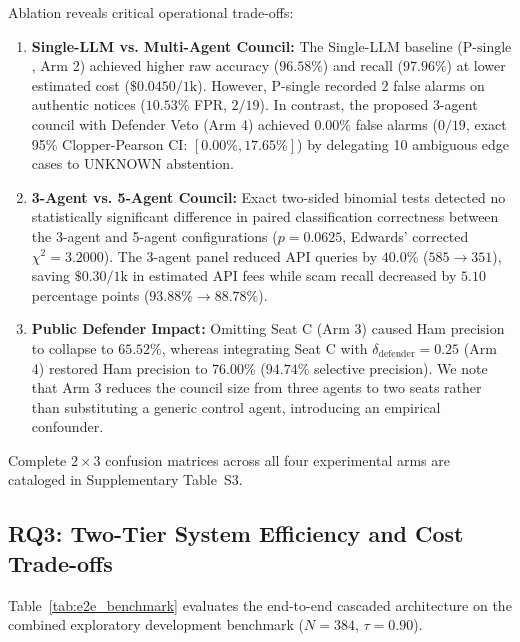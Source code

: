 \documentclass[journal]{IEEEtran}
\begin{document}
Ablation reveals critical operational trade-offs:
\begin{enumerate}
    \item \textbf{Single-LLM vs. Multi-Agent Council:} The Single-LLM baseline ($\text{P-single}$, Arm 2) achieved higher raw accuracy ($96.58\%$) and recall ($97.96\%$) at lower estimated cost ($\$0.0450/1\text{k}$). However, P-single recorded $2$ false alarms on authentic notices ($10.53\%$ FPR, $2/19$). In contrast, the proposed 3-agent council with Defender Veto (Arm 4) achieved $0.00\%$ false alarms ($0/19$, exact 95\% Clopper-Pearson CI: $[0.00\%, 17.65\%]$) by delegating 10 ambiguous edge cases to UNKNOWN abstention.
    \item \textbf{3-Agent vs. 5-Agent Council:} Exact two-sided binomial tests detected no statistically significant difference in paired classification correctness between the 3-agent and 5-agent configurations ($p = 0.0625$, Edwards' corrected $\chi^2 = 3.2000$). The 3-agent panel reduced API queries by $40.0\%$ ($585 \to 351$), saving $\$0.30/1\text{k}$ in estimated API fees while scam recall decreased by $5.10$ percentage points ($93.88\% \to 88.78\%$).
    \item \textbf{Public Defender Impact:} Omitting Seat C (Arm 3) caused Ham precision to collapse to $65.52\%$, whereas integrating Seat C with $\delta_{\text{defender}} = 0.25$ (Arm 4) restored Ham precision to $76.00\%$ ($94.74\%$ selective precision). We note that Arm 3 reduces the council size from three agents to two seats rather than substituting a generic control agent, introducing an empirical confounder.
\end{enumerate}

Complete $2 \times 3$ confusion matrices across all four experimental arms are cataloged in Supplementary Table~S3.

\subsection{RQ3: Two-Tier System Efficiency and Cost Trade-offs}
\label{subsec:res_rq3}

Table~\ref{tab:e2e_benchmark} evaluates the end-to-end cascaded architecture on the combined exploratory development benchmark ($N=384$, $\tau=0.90$).
\end{document}

